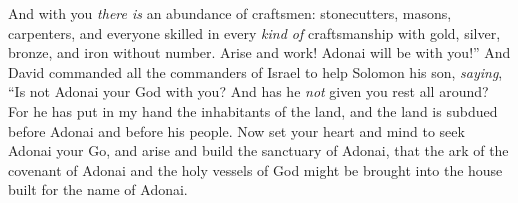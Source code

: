 \begin{biblechapter}
\verse And with you \textit{there is} an abundance of craftsmen: stonecutters, masons, carpenters, and everyone skilled in every \textit{kind of} craftsmanship
\verse with gold, silver, bronze, and iron without number. Arise and work! Adonai will be with you!”
\verse And David commanded all the commanders of Israel to help Solomon his son, \textit{saying},
\verse “Is not Adonai your God with you? And has he \textit{not} given you rest all around? For he has put in my hand the inhabitants of the land, and the land is subdued before Adonai and before his people.
\verse Now set your heart and mind to seek Adonai your Go, and arise and build the sanctuary of Adonai, that the ark of the covenant of Adonai and the holy vessels of God might be brought into the house built for the name of Adonai.
\end{biblechapter}

